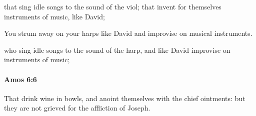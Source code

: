 			\begin{versebox}
					\item[BHS] 
					\item[LXX] 
					\item[ASV] that sing idle songs to the sound of the viol; that invent for themselves instruments of music, like David;
					\item[NIV] You strum away on your harps like David and improvise on musical instruments.
					\item[NRSV] who sing idle songs to the sound of the harp, and like David improvise on instruments of music;
			\end{versebox}

		\paragraph{Amos 6:6} %
			\label{AMOS-6-6}

			That drink wine in bowls, and anoint themselves with the chief ointments: but they are not grieved for the affliction of Joseph.

